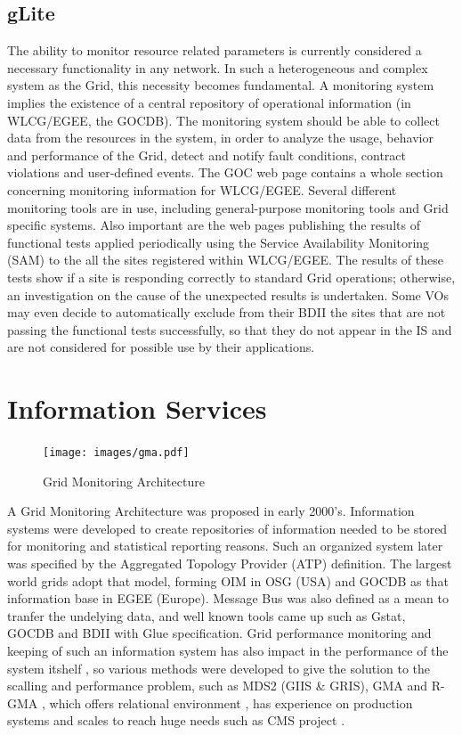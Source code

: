 \subsection{gLite}

The ability to monitor resource related parameters is currently considered a
necessary functionality in any network. In such a heterogeneous and complex
system as the Grid, this necessity becomes fundamental. A monitoring system
implies the existence of a central repository of operational information (in
WLCG/EGEE, the GOCDB). The monitoring system should be able to collect data from
the resources in the system, in order to analyze the usage, behavior and
performance of the Grid, detect and notify fault conditions, contract violations
and user-defined events.
The GOC web page contains a whole section
concerning monitoring information for WLCG/EGEE. Several different monitoring
tools are in use, including general-purpose monitoring tools and Grid specific
systems.
Also important are the web pages publishing the results of functional tests
applied periodically using the Service Availability Monitoring (SAM) to the all
the sites registered within WLCG/EGEE. The results of these tests show if a site
is responding correctly to standard Grid operations; otherwise, an investigation
on the cause of the unexpected results is undertaken. Some VOs may even decide
to automatically exclude from their BDII the sites that are not passing the
functional tests successfully, so that they do not appear in the IS and are not
considered for possible use by their applications.



\section{Information Services}
\begin{figure}[htb]
\centering
 \texttt{[image: images/gma.pdf]}
\caption{Grid Monitoring Architecture}
\label{figure:gma}
\end{figure}
A Grid Monitoring Architecture \cite{tierney2002grid} was proposed in early
2000's. Information systems were developed to create repositories of information
needed to be stored for monitoring and statistical reporting reasons. Such an
organized system later was specified by the Aggregated Topology Provider (ATP)
definition. The largest world grids adopt that model, forming OIM in OSG (USA)
and GOCDB as that information base in EGEE (Europe). Message Bus was also
defined as a mean to tranfer the undelying data, and well known tools came up
such as Gstat, GOCDB and BDII with Glue specification. Grid performance
monitoring and keeping of such an information system has also impact in the
performance of the system itshelf \cite{zhang2003performance}, so various
methods were developed to give the solution to the scalling and performance
problem, such as MDS2 (GIIS \& GRIS), GMA and R-GMA
\cite{wilson2004information}, which offers relational environment
\cite{fisher2001relational}, has experience on production systems 
\cite{byrom-production} and scales to reach huge needs such as CMS project
\cite{Bonacorsi2004,Byrom}.


